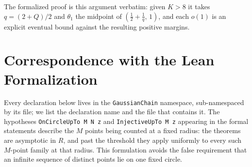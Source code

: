 \documentclass[11pt]{article}
\begin{document}
The formalized proof is this argument verbatim: given \(K>8\) it takes \(q=(2+Q)/2\) and \(\theta_1\) the midpoint of \((\tfrac12+\tfrac1q,\,1)\), and each \(o(1)\) is an explicit eventual bound against the resulting positive margins.

\section{Correspondence with the Lean Formalization}
\label{sec:lean-correspondence}

Every declaration below lives in the \texttt{GaussianChain} namespace, sub-namespaced by its file; we list the declaration name and the file that contains it.
The hypotheses \texttt{OnCircleUpTo M N z} and \texttt{InjectiveUpTo M z} appearing in the formal statements describe the \(M\) points being counted at a fixed radius: the theorems are asymptotic in \(R\), and past the threshold they apply uniformly to every such \(M\)-point family at that radius.
This formulation avoids the false requirement that an infinite sequence of distinct points lie on one fixed circle.
\end{document}
